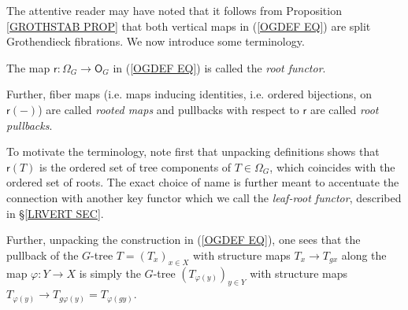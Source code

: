 \documentclass[a4paper,10pt]{article}%
\begin{document}
The attentive reader may have noted
that it follows from 
Proposition \ref{GROTHSTAB PROP}
that both vertical maps in (\ref{OGDEF EQ})
are split Grothendieck fibrations. We now introduce some terminology.

\begin{definition}\label{ROOTPULL DEF}
The map $\mathsf{r} \colon \Omega_G \to \mathsf{O}_G$
in (\ref{OGDEF EQ}) is called the \textit{root functor}.

Further, fiber maps (i.e. maps inducing identities, i.e. ordered bijections, on $\mathsf{r}(\minus)$) are called \textit{rooted maps} and pullbacks with respect to $\mathsf{r}$ are called
\textit{root pullbacks}.
\end{definition}

To motivate the terminology, 
note first that unpacking definitions shows that 
$\mathsf{r}(T)$ is the ordered set of tree components of  
$T\in \Omega_G$,
which coincides with the ordered set of roots.
The exact choice of name is further meant to accentuate 
the connection with another key functor
which we call the \textit{leaf-root functor},
described in \S \ref{LRVERT SEC}.

Further, unpacking the construction in (\ref{OGDEF EQ}), one sees that the pullback of the $G$-tree
$T = (T_x)_{x \in X}$ with structure maps $T_x \to T_{g x}$
along the map 
$\varphi \colon Y \to X$
is simply the $G$-tree
$(T_{\varphi(y)})_{y \in Y}$
with structure maps 
$T_{\varphi(y)} \to T_{g \varphi(y)} = T_{\varphi(g y)}$.
\end{document}
